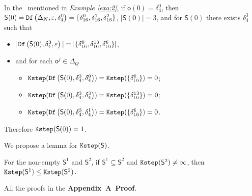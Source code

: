 \begin{example}\label{exa:9}
In the \BCN\ mentioned in {\em Example \ref{exa:2}}, if $\mathsf{o}(0)=\delta_4^0$, then $\mathsf{S}(0)={\tt Df}\left(\Delta_N,\varepsilon,\delta_4^0\right)=\{\delta_{16}^0,\delta_{16}^1,\delta_{16}^2\}$, $|\mathsf{S}(0)|=3$, and for $\mathsf{S}(0)$ there exists $\delta_{4}^3$ such that 
 \begin{itemize}
 \item  $|{\tt Df}\left(\mathsf{S}(0),\delta_{4}^3,\varepsilon\right)|=|\{\delta_{16}^0,\delta_{16}^{13},\delta_{16}^6\}|$,
 \item   and for each $\mathsf{o}^{j}\in \Delta_Q$
  \begin{itemize}
  \item   ${\tt Kstep}({\tt Df}\left(\mathsf{S}(0),\delta_{4}^3,\delta_{4}^0\right))={\tt Kstep}(\{\delta_{16}^0\})=0$;
 \item  ${\tt Kstep}({\tt Df}\left(\mathsf{S}(0),\delta_{4}^3,\delta_{4}^3\right))={\tt Kstep}(\{\delta_{16}^{13}\})=0$;
  \item  ${\tt Kstep}({\tt Df}\left(\mathsf{S}(0),\delta_{4}^3,\delta_{4}^1\right))={\tt Kstep}(\{\delta_{16}^{6}\})=0$.
 \end{itemize}
 \end{itemize}
 Therefore ${\tt Kstep}(\mathsf{S}(0))=1$.
\end{example}  

We propose a lemma for ${\tt Kstep}(\mathsf{S})$.

\begin{lemma}
For the non-empty $\mathsf{S}^{1}$ and $\mathsf{S}^{2}$, if $\mathsf{S}^{1}\subseteq\mathsf{S}^{2}$ and ${\tt Kstep}(\mathsf{S}^{2})\ne\infty$, then ${\tt Kstep}(\mathsf{S}^{1})\le{\tt Kstep}(\mathsf{S}^{2})$.%
  \label{lemm:1}
\end{lemma}

All the proofs in the {\bf Appendix~A~Proof}. 

